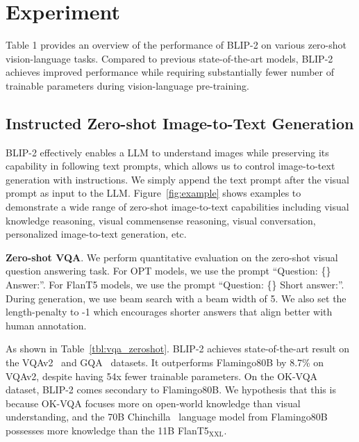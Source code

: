 \vspace{-1ex}
\section{Experiment}
\vspace{-0.5ex}
\label{sec:experiment}




Table 1 provides an overview of the performance of BLIP-2 on various zero-shot vision-language tasks.
Compared to previous state-of-the-art models,
BLIP-2 achieves improved performance while requiring substantially fewer number of trainable parameters during vision-language pre-training.

\vspace{-0.5ex}
\subsection{Instructed Zero-shot Image-to-Text Generation}
\vspace{-0.5ex}
BLIP-2 effectively enables a LLM to understand images while preserving its capability in following text prompts,
which allows us to control image-to-text generation with instructions.
We simply append the text prompt after the visual prompt as input to the LLM.
Figure~\ref{fig:example} shows examples to demonstrate a wide range of zero-shot image-to-text capabilities including visual knowledge reasoning, visual commensense reasoning,
visual conversation,
personalized image-to-text generation, etc.





\textbf{Zero-shot VQA}.
We perform quantitative evaluation on the zero-shot visual question answering task.
For OPT models, we use the prompt ``Question: {\small\{\}} Answer:''.
For FlanT5 models, we use the prompt ``Question: {\small\{\}} Short answer:''.
During generation,
we use beam search with a beam width of 5.
We also set the length-penalty to -1 which encourages shorter answers that align better with human annotation.

As shown in Table~\ref{tbl:vqa_zeroshot}.
BLIP-2 achieves state-of-the-art result on the VQAv2~\cite{VQA2} and GQA~\cite{GQA} datasets.
It outperforms Flamingo80B by 8.7\% on VQAv2, despite having 54x fewer trainable parameters.
On the OK-VQA~\cite{okvqa} dataset,
BLIP-2 comes secondary to Flamingo80B.
We hypothesis that this is because OK-VQA focuses more on open-world knowledge than visual understanding,
and the 70B Chinchilla~\cite{chinchilla} language model from Flamingo80B possesses more knowledge than the 11B FlanT5$_\text{XXL}$.


